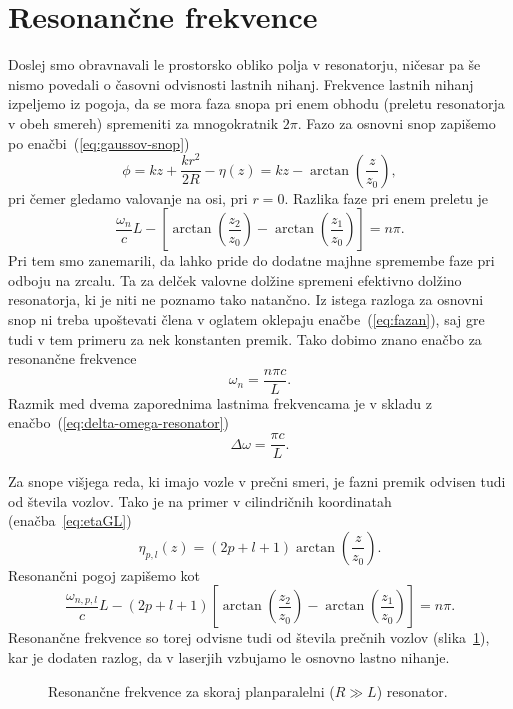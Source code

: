 \section{Resonančne frekvence}
Doslej smo obravnavali le prostorsko obliko polja v resonatorju, ničesar pa še nismo
povedali o časovni odvisnosti lastnih nihanj. Frekvence
lastnih nihanj izpeljemo iz pogoja, 
da se mora faza snopa pri enem obhodu
(preletu resonatorja v obeh smereh) spremeniti za mnogokratnik
$2\pi$. Fazo za osnovni snop zapišemo po enačbi~(\ref{eq:gaussov-snop})
\begin{equation}
\phi = kz+\frac{kr^{2}}{2R} -\eta(z) = kz-\arctan \left(\frac{z}{z_{0}}\right),
\label{eq:fazag}
\end{equation}
pri čemer  gledamo valovanje na osi, pri $r=0$. 
Razlika faze pri enem preletu je 
\begin{equation}
\frac{\omega_{n}}{c}L-\left[\arctan \left(\frac{z_{2}}{z_{0}}\right)-
\arctan\left(\frac{z_{1}}{z_{0}}\right)\right]=n\pi.
\label{eq:fazan}
\end{equation}
Pri tem smo zanemarili, da lahko pride do dodatne majhne spremembe
faze pri odboju na zrcalu. Ta za delček valovne dolžine
spremeni efektivno dolžino resonatorja, ki je niti ne poznamo
tako natančno. Iz istega razloga za osnovni snop ni treba upoštevati člena
v oglatem oklepaju enačbe~(\ref{eq:fazan}), saj gre tudi v tem primeru za nek 
konstanten premik. Tako dobimo znano enačbo za resonančne frekvence 
\begin{equation}
\omega_{n}=\frac{n\pi c}{L}.
\label{eq:omega}
\end{equation}
Razmik med dvema zaporednima lastnima frekvencama je v skladu z enačbo~(\ref{eq:delta-omega-resonator})
\begin{equation}
\Delta\omega=\frac{\pi c}{L}.
\label{eq:deltaomega}
\end{equation}

Za snope višjega reda, ki imajo vozle v prečni smeri, je fazni premik
odvisen tudi od števila vozlov. Tako je na primer v cilindričnih koordinatah
(enačba~\ref{eq:etaGL})
\begin{equation}
\eta_{p,l}(z)=(2p+l+1)\arctan\left(\frac{z}{z_{0}}\right).
\end{equation}
Resonančni pogoj zapišemo kot
\begin{equation}
\frac{\omega_{n,p,l}}{c}L-(2p+l+1)\left[\arctan\left(\frac{z_{2}}{z_{0}}\right)-
\arctan\left(\frac{z_{1}}{z_{0}}\right)\right]=n\pi.
\end{equation}
Resonančne frekvence so torej odvisne tudi od števila prečnih vozlov (slika~\ref{fig:crte}),
kar je dodaten razlog, da v laserjih vzbujamo le osnovno lastno nihanje.
\begin{figure}[h]
\centering
\def\svgwidth{90truemm} 

\caption{Resonančne frekvence za skoraj planparalelni ($R\gg L$) resonator.}
\label{fig:crte}
\end{figure}

